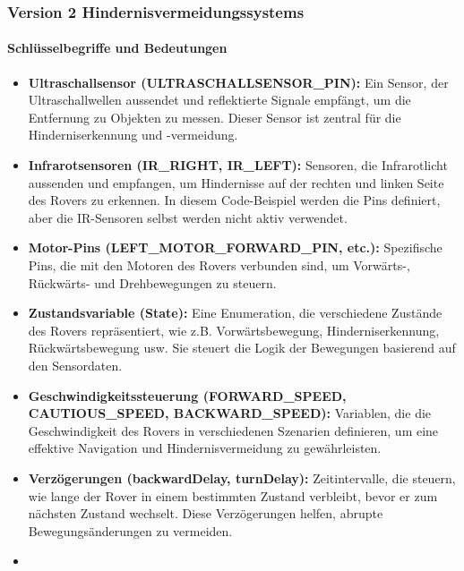 \documentclass{vorlage-design-main}
\begin{document}
\newpage

\hypertarget{version-2-hindernisvermeidungssystems}{%
\subsubsection{Version 2
Hindernisvermeidungssystems}\label{version-2-hindernisvermeidungssystems}}

\hypertarget{schluxfcsselbegriffe-und-bedeutungen}{%
\paragraph{Schlüsselbegriffe und
Bedeutungen}\label{schluesselbegriffe-und-bedeutungen}}

\begin{itemize}
\item
  \textbf{Ultraschallsensor (ULTRASCHALLSENSOR\_PIN):} Ein Sensor, der
  Ultraschallwellen aussendet und reflektierte Signale empfängt, um die
  Entfernung zu Objekten zu messen. Dieser Sensor ist zentral für die
  Hinderniserkennung und -vermeidung.
\item
  \textbf{Infrarotsensoren (IR\_RIGHT, IR\_LEFT):} Sensoren, die
  Infrarotlicht aussenden und empfangen, um Hindernisse auf der rechten
  und linken Seite des Rovers zu erkennen. In diesem Code-Beispiel
  werden die Pins definiert, aber die IR-Sensoren selbst werden nicht
  aktiv verwendet.
\item
  \textbf{Motor-Pins (LEFT\_MOTOR\_FORWARD\_PIN, etc.):} Spezifische
  Pins, die mit den Motoren des Rovers verbunden sind, um Vorwärts-,
  Rückwärts- und Drehbewegungen zu steuern.
\item
  \textbf{Zustandsvariable (State):} Eine Enumeration, die verschiedene
  Zustände des Rovers repräsentiert, wie z.B. Vorwärtsbewegung,
  Hinderniserkennung, Rückwärtsbewegung usw. Sie steuert die Logik der
  Bewegungen basierend auf den Sensordaten.
\item
  \textbf{Geschwindigkeitssteuerung (FORWARD\_SPEED, CAUTIOUS\_SPEED,
  BACKWARD\_SPEED):} Variablen, die die Geschwindigkeit des Rovers in
  verschiedenen Szenarien definieren, um eine effektive Navigation und
  Hindernisvermeidung zu gewährleisten.
\item
  \textbf{Verzögerungen (backwardDelay, turnDelay):} Zeitintervalle, die
  steuern, wie lange der Rover in einem bestimmten Zustand verbleibt,
  bevor er zum nächsten Zustand wechselt. Diese Verzögerungen helfen,
  abrupte Bewegungsänderungen zu vermeiden.
\item

\end{itemize}
\end{document}
